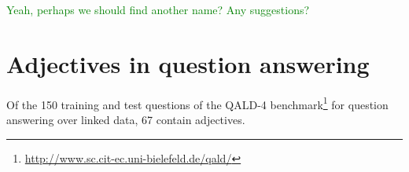 \documentclass[11pt]{article}
\begin{document}
%
%
%

\textcolor{green}{Yeah, perhaps we should find another name? Any suggestions?}

\section{Adjectives in question answering}

Of the 150 training and test questions of the QALD-4 benchmark\footnote{\url{http://www.sc.cit-ec.uni-bielefeld.de/qald/}} 
for question answering over linked data, 67 contain adjectives. 
\end{document}
